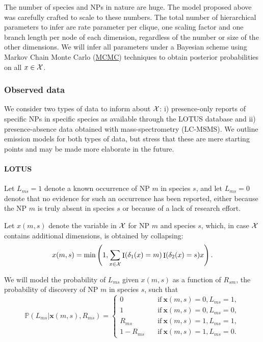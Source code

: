 \documentclass[
11pt, %
oneside, %
english, %
singlespacing, %
headsepline, %
chapterinoneline, %
]{MastersDoctoralThesis} %
\DeclareMathOperator{\Ind}{I}
\def\P{\mathbb{P}}
\def\x{\boldsymbol{x}}
\def\X{{\cal X}}
\begin{document}
The number of species and NPs in nature are huge. The model proposed above was carefully crafted to scale to these numbers. The total number of hierarchical parameters to infer are rate parameter per clique, one scaling factor and one branch length per node of each dimension, regardless of the number or size of the other dimensions. We will infer all parameters under a Bayesian scheme using Markov Chain Monte Carlo (\href{https://en.wikipedia.org/wiki/Markov_chain_Monte_Carlo}{MCMC}) techniques to obtain posterior probabilities on all $x \in \X$.

\subsubsection{Observed data}

We consider two types of data to inform about $\X$:  i) presence-only reports of specific NPs in specific species as available through the LOTUS database \cite{rutz_2022a} and ii) presence-absence data obtained with mass-spectrometry (LC-MSMS). We outline emission models for both types of data, but stress that these are mere starting points and may be made more elaborate in the future.

\paragraph{LOTUS }

Let $L_{ms} = 1$ denote a known occurrence of NP $m$ in species $s$, and let $L_{ms}=0$ denote that no evidence for such an occurrence has been reported, either because the NP $m$ is truly absent in species $s$ or because of a lack of research effort.

Let $x(m,s)$ denote the variable in $\X$ for NP $m$ and species $s$, which, in case $\X$ contains additional dimensions, is obtained by collapsing:
\begin{equation*}
	x(m,s) = \min \left(1, \sum_{x \in \X} \Ind(\delta_1(x)=m) \Ind(\delta_2(x)=s) x \right).
\end{equation*}

We will model the probability of $L_{ms}$ given $x(m,s)$ as a function of $R_{sm}$, the probability of discovery of NP $m$ in species $s$, such that
\begin{equation*}
	\P(L_{ms}|\x(m,s), R_{ms}) =
	\begin{cases}
		0 \quad &\mathrm{if\ } \x(m,s)=0, L_{ms} = 1,\\
		1 \quad &\mathrm{if\ } \x(m,s)=0, L_{ms} = 0,\\
		R_{ms} \quad &\mathrm{if\ } \x(m,s)=1, L_{ms} = 1,\\
		1- R_{ms} \quad &\mathrm{if\ } \x(m,s)=1, L_{ms} = 0.
	\end{cases}
\end{equation*}
\end{document}
